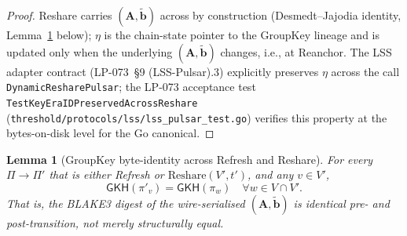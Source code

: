 \documentclass[11pt]{article}
\newtheorem{lemma}[theorem]{Lemma}
\begin{document}
\begin{proof}
Reshare carries $(\mathbf{A}, \tilde{\mathbf{b}})$ across by
construction (Desmedt--Jajodia identity, Lemma~\ref{lem:gk-identical}
below); $\eta$ is the chain-state pointer to the GroupKey lineage and
is updated only when the underlying $(\mathbf{A}, \tilde{\mathbf{b}})$
changes, i.e., at Reanchor. The LSS adapter contract
(LP-073~\S9 (LSS-Pulsar).3) explicitly preserves $\eta$ across
the call \texttt{DynamicResharePulsar}; the LP-073 acceptance test
\texttt{TestKeyEraIDPreservedAcrossReshare}
(\texttt{threshold/protocols/lss/lss\_pulsar\_test.go}) verifies this
property at the bytes-on-disk level for the Go canonical.
\end{proof}

\begin{lemma}[GroupKey byte-identity across Refresh and Reshare]
\label{lem:gk-identical}
For every $\Pi \to \Pi'$ that is either Refresh or
$\mathrm{Reshare}(V', t')$, and any $v \in V'$,
\[
  \mathsf{GKH}(\pi'_v) = \mathsf{GKH}(\pi_w)
  \quad \forall w \in V \cap V'.
\]
That is, the BLAKE3 digest of the wire-serialised
$(\mathbf{A}, \tilde{\mathbf{b}})$ is identical pre- and post-transition,
not merely structurally equal.
\end{lemma}
\end{document}
